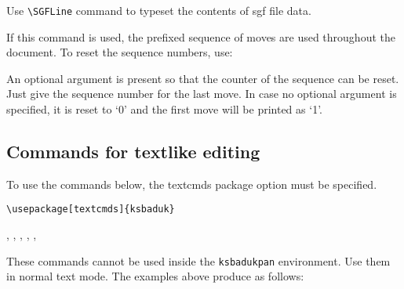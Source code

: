 \documentclass[a4paper]{oblivoir}
\begin{document}
Use \verb|\SGFLine| command to typeset the contents of sgf file data.

\begin{boxedverbatim}
\end{boxedverbatim}

\begin{ksbadukpan}[badukpansize=6]
\end{ksbadukpan}

If this command is used, the prefixed sequence of moves are used throughout the document. To reset the sequence numbers, use:
\begin{boxedverbatim}
\ResetSGFCounter
\end{boxedverbatim}
An optional argument is present so that the counter of the sequence can be reset. Just give the sequence number for the last move. In case no optional argument is specified, it is reset to `0' and the first move will be printed as `1'.

\begin{boxedverbatim}
\ResetSGFCounter[12]
\end{boxedverbatim}

\begin{ksbadukpan}[badukpansize=6][UL]
\KSBadukContinue
\ResetSGFCounter[12]
\end{ksbadukpan}


\subsection{%
Commands for textlike editing
}

To use the commands below, the textcmds package option must be specified.
\begin{verbatim}
\usepackage[textcmds]{ksbaduk}
\end{verbatim}

\begin{boxedverbatim}
, ,
\WhiteMText, \BlackMText,
\WhiteCText, \BlackCText
\end{boxedverbatim}

These commands cannot be used inside the \texttt{ksbadukpan} environment.
Use them in normal text mode.
The examples above produce as follows:
\end{document}
